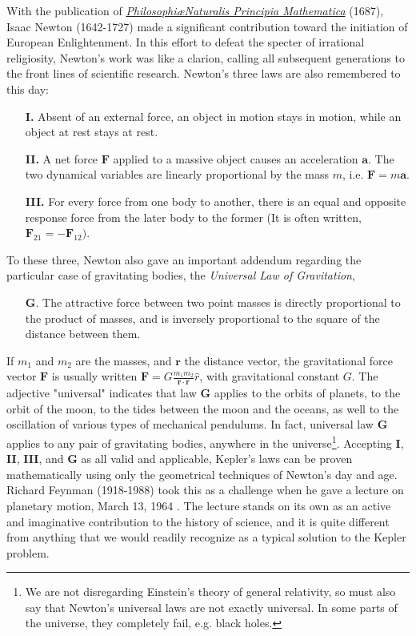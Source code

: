 \documentclass[nofootinbib,preprint]{revtex4-1}
\begin{document}
With the publication of 
\href{https://archive.org/details/philosophiaenat00newt}{\textit{Philosophi\ae \;Naturalis Principia Mathematica}} 
(1687), Isaac Newton (1642-1727) made a significant contribution toward the initiation 
of European Enlightenment. In this effort to defeat the specter of irrational religiosity, 
Newton's work was like a clarion, calling all subsequent generations to the front lines
of scientific research. Newton's three laws are also remembered to this day:
\begin{itemize}
\item[\textbf{I.} ] Absent of an external force, an object in motion stays in motion, 
while an object at rest stays at rest.  
\item[\textbf{II.} ] A net force $\mathbf{F}$ applied to a massive object causes an 
acceleration $\mathbf{a}$. The two dynamical variables are linearly proportional 
by the mass $m$, i.e. $\mathbf{F} = m \mathbf{a}$.  
\item[\textbf{III.} ] For every force from one body to another, there is an equal 
and opposite response force from the later body to the former (It is often written, 
$\mathbf{F}_{21} = -\mathbf{F}_{12} )$.
\end{itemize}
To these three, Newton also gave an important addendum regarding the particular case of 
gravitating bodies, the \textit{Universal Law of Gravitation}, 
\begin{itemize}
\item[\textbf{G}. ] The attractive force between two point masses is 
directly proportional to the product of masses, and is inversely 
proportional to the square of the distance between them.  
\end{itemize}
If $m_1$ and $m_2$ are the masses, and $\mathbf{r}$ the distance vector, the 
gravitational force vector $\mathbf{F}$ is usually written 
$\mathbf{F} =G \frac{m_1 m_2}{\mathbf{r}\cdot\mathbf{r}}\hat{r}$,
with gravitational constant $G$. The adjective "universal" indicates that law
\textbf{G} applies to the orbits of planets, to the orbit of the moon, to the 
tides between the moon and the oceans, as well to the oscillation of various 
types of mechanical pendulums. In fact, universal law \textbf{G} applies to any 
pair of gravitating bodies, anywhere in the universe\footnote{We are not disregarding Einstein's theory of general relativity, 
so must also say that Newton's universal laws are not exactly universal. 
In some parts of the universe, they completely fail, e.g. black holes.}. Accepting 
\textbf{I}, \textbf{II}, \textbf{III}, and \textbf{G} as all valid and applicable,
Kepler's laws can be proven mathematically using only the geometrical techniques of 
Newton's day and age. Richard Feynman (1918-1988) took this as a challenge when 
he gave a lecture on planetary motion, March 13, 1964 \cite{Feynman1964}. The lecture stands
on its own as an active and imaginative contribution to the history of science, 
and it is quite different from anything that we would readily recognize as a 
typical solution to the Kepler problem. 
\end{document}
